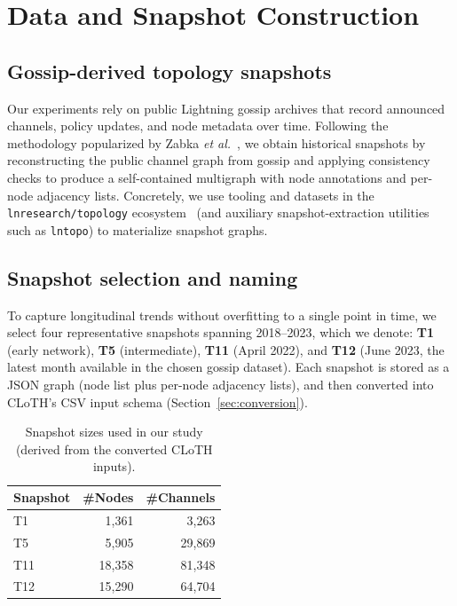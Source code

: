 \documentclass{article}
\begin{document}
\section{Data and Snapshot Construction}
\label{sec:data}

\subsection{Gossip-derived topology snapshots}
Our experiments rely on public Lightning gossip archives that record announced channels, policy updates, and node metadata over time.
Following the methodology popularized by Zabka \emph{et al.}~\cite{zabka2024centrality}, we obtain historical snapshots by reconstructing the public channel graph from gossip and applying consistency checks to produce a self-contained multigraph with node annotations and per-node adjacency lists.
Concretely, we use tooling and datasets in the \texttt{lnresearch/topology} ecosystem~\cite{lnresearchTopology} (and auxiliary snapshot-extraction utilities such as \texttt{lntopo}) to materialize snapshot graphs.

\subsection{Snapshot selection and naming}
To capture longitudinal trends without overfitting to a single point in time, we select four representative snapshots spanning 2018--2023, which we denote:
\textbf{T1} (early network), \textbf{T5} (intermediate), \textbf{T11} (April 2022), and \textbf{T12} (June 2023, the latest month available in the chosen gossip dataset).
Each snapshot is stored as a JSON graph (node list plus per-node adjacency lists), and then converted into CLoTH's CSV input schema (Section~\ref{sec:conversion}).

\begin{table}[t]
\centering
\caption{Snapshot sizes used in our study (derived from the converted CLoTH inputs).}
\label{tab:snapshot-sizes}
\begin{tabular}{lrr}
\toprule
Snapshot & \#Nodes & \#Channels \\
\midrule
T1  & 1{,}361  & 3{,}263 \\
T5  & 5{,}905  & 29{,}869 \\
T11 & 18{,}358 & 81{,}348 \\
T12 & 15{,}290 & 64{,}704 \\
\bottomrule
\end{tabular}
\end{table}
\end{document}
